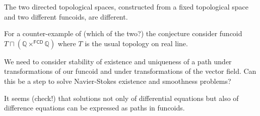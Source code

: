 \begin{conjecture}
The two directed topological spaces, constructed from a fixed topological space and two different funcoids,
are different.
\end{conjecture}

For a counter-example of (which of the two?) the conjecture consider funcoid $T\sqcap(\mathbb{Q}\times^{\mathsf{FCD}}\mathbb{Q})$
where $T$ is the usual topology on real line.

We need to consider stability of existence and uniqueness of a path under transformations of our funcoid and
under transformations of the vector field. Can this be a step to solve Navier-Stokes existence and smoothness problems?

It seems (check!) that solutions not only of differential equations but also of difference equations can be
expressed as paths in funcoids.
